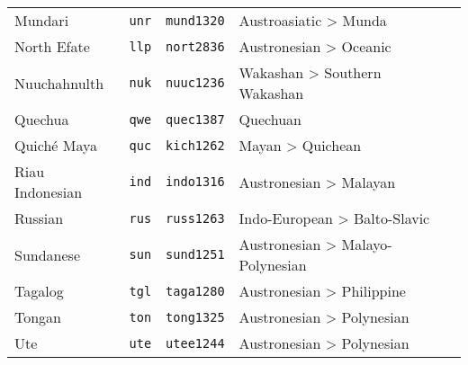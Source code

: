 \begin{table}[h]
\begin{tabularx}{\linewidth}{ l l l l l }
    Mundari                          & \texttt{unr}       & \texttt{mund1320}   & Austroasiatic > Munda\\
    North Efate                      & \texttt{llp}       & \texttt{nort2836}   & Austronesian > Oceanic\\
    Nuuchahnulth                     & \texttt{nuk}       & \texttt{nuuc1236}   & Wakashan > Southern Wakashan\\
    Quechua                          & \texttt{qwe}       & \texttt{quec1387}   & Quechuan\\
    Quiché Maya                      & \texttt{quc}       & \texttt{kich1262}   & Mayan > Quichean\\
    Riau Indonesian                  & \texttt{ind}       & \texttt{indo1316}   & Austronesian > Malayan\\
    Russian                          & \texttt{rus}       & \texttt{russ1263}   & Indo-European > Balto-Slavic\\
    Sundanese                        & \texttt{sun}       & \texttt{sund1251}   & Austronesian > Malayo-Polynesian\\
    Tagalog                          & \texttt{tgl}       & \texttt{taga1280}   & Austronesian > Philippine\\
    Tongan                           & \texttt{ton}       & \texttt{tong1325}   & Austronesian > Polynesian\\
    Ute                              & \texttt{ute}       & \texttt{utee1244}   & Austronesian > Polynesian\\
  \end{tabularx}
\end{table}
